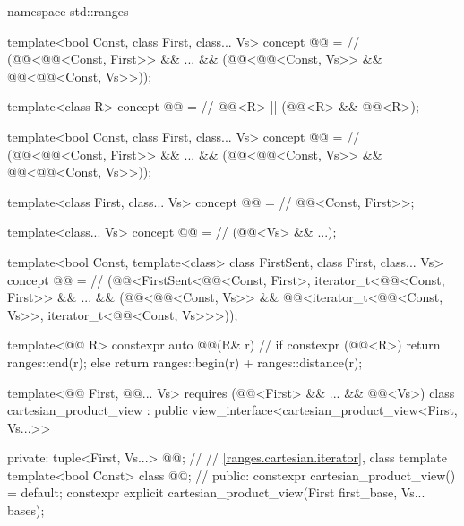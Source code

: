 \begin{codeblock}
namespace std::ranges {
  template<bool Const, class First, class... Vs>
  concept @@ =          // \expos
    (@@<@@<Const, First>> && ... &&
      (@@<@@<Const, Vs>>
        && @@<@@<Const, Vs>>));

  template<class R>
  concept @@ =                // \expos
    @@<R> || (@@<R> && @@<R>);

  template<bool Const, class First, class... Vs>
  concept @@ =          // \expos
    (@@<@@<Const, First>> && ... &&
      (@@<@@<Const, Vs>>
        && @@<@@<Const, Vs>>));

  template<class First, class... Vs>
  concept @@ =                 // \expos
    @@<Const, First>>;

  template<class... Vs>
  concept @@ =                  // \expos
    (@@<Vs> && ...);

  template<bool Const, template<class> class FirstSent, class First, class... Vs>
    concept @@ =               // \expos
      (@@<FirstSent<@@<Const, First>,
          iterator_t<@@<Const, First>> && ...
        && (@@<@@<Const, Vs>>
          && @@<iterator_t<@@<Const, Vs>>,
              iterator_t<@@<Const, Vs>>>));

  template<@@ R>
  constexpr auto @@(R& r) {       // \expos
    if constexpr (@@<R>) {
      return ranges::end(r);
    } else {
      return ranges::begin(r) + ranges::distance(r);
    }
  }

  template<@@ First, @@... Vs>
    requires (@@<First> && ... && @@<Vs>)
  class cartesian_product_view : public view_interface<cartesian_product_view<First, Vs...>> {
  private:
    tuple<First, Vs...> @@;                 // \expos
    // \ref{ranges.cartesian.iterator}, class template 
    template<bool Const> class @@;       // \expos
  public:
    constexpr cartesian_product_view() = default;
    constexpr explicit cartesian_product_view(First first_base, Vs... bases);

}}
\end{codeblock}
